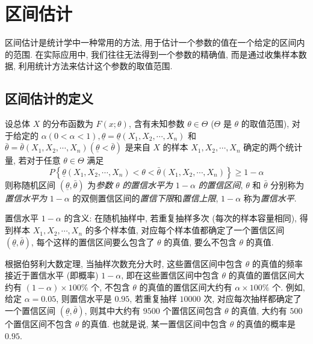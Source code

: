 \section{区间估计}

区间估计是统计学中一种常用的方法, 用于估计一个参数的值在一个给定的区间内的范围.
在实际应用中, 我们往往无法得到一个参数的精确值, 而是通过收集样本数据, 利用统计方法来估计这个参数的取值范围.

\subsection{区间估计的定义}

\begin{definition}[区间估计]
    设总体 $ X $ 的分布函数为 $ F(x ; \theta)$, 含有未知参数 $ \theta \in \Theta$ ($\Theta $ 是 $ \theta $ 的取值范围), 
    对于给定的 $ \alpha(0<\alpha<1), \underline{\theta}=\underline{\theta}\left(X_{1}, X_{2}, \cdots, X_{n}\right) $ 和 $ \bar{\theta}=\bar{\theta}\left(X_{1}, X_{2}, \cdots, X_{n}\right)(\underline{\theta}<\bar{\theta}) $
    是来自 $ X $ 的样本 $ X_{1}, X_{2}, \cdots, X_{n} $ 确定的两个统计量, 若对于任意 $ \theta \in \Theta $ 满足
    $$P\left\{\underline{\theta}\left(X_{1}, X_{2}, \cdots, X_{n}\right)<\theta<\bar{\theta}\left(X_{1}, X_{2}, \cdots, X_{n}\right)\right\} \geqslant 1-\alpha$$
    则称随机区间 $ (\underline{\theta}, \bar{\theta}) $ 为\textit{参数} $ \theta $ \textit{的置信水平为} $ 1-\alpha $ \textit{的置信区间}, $\theta $ 和 $ \bar{\theta} $
    分别称为\textit{置信水平为} $ 1-\alpha $ 的双侧置信区间的\textit{置信下限}和\textit{置信上限}, $1-\alpha $ 称为\textit{置信水平}.
\end{definition}

置信水平 $ 1-\alpha $ 的含义: 在随机抽样中, 若重复抽样多次 (每次的样本容量相同), 
得到样本 $ X_{1}, X_{2}, \cdots, X_{n} $ 的多个样本值, 对应每个样本值都确定了一个置信区间 $ (\underline{\theta}, \bar{\theta}) $, 
每个这样的置信区间要么包含了 $ \theta $ 的真值, 要么不包含 $ \theta $ 的真值.

根据伯努利大数定理, 当抽样次数充分大时, 这些置信区间中包含 $ \theta $ 的真值的频率接近于置信水平 (即概率) $ 1-\alpha $, 
即在这些置信区间中包含 $ \theta $ 的真值的置信区间大约有 $ (1-\alpha) \times 100 \% $ 个, 
不包含 $ \theta $ 的真值的置信区间大约有 $ \alpha \times 100 \% $ 个.
例如, 给定 $ \alpha=0.05 $, 则置信水平是 $0.95$, 若重复抽样 $10000$ 次, 对应每次抽样都确定了一个置信区间 $ (\underline{\theta}, \bar{\theta}) $, 
则其中大约有 $9500$ 个置信区间包含 $ \theta $ 的真值, 大约有 $500$ 个置信区间不包含 $ \theta $ 的真值.
也就是说, 某一置信区间中包含 $ \theta $ 的真值的概率是 $0.95$.

